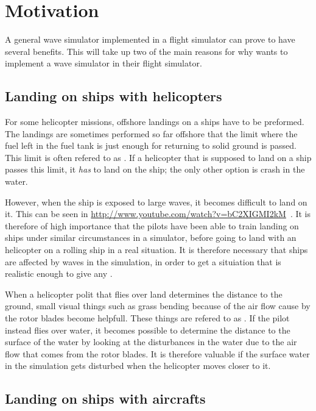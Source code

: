 \chapter{Motivation}

A general wave simulator implemented in a flight simulator can prove to have several benefits. This \levelname will take up two of the main reasons for why \Saab wants to implement a wave simulator in their flight simulator.

\section{Landing on ships with helicopters}

For some helicopter missions, offshore landings on a ships have to be preformed. The landings are sometimes performed so far offshore that the limit where the fuel left in the fuel tank is just enough for returning to solid ground is passed. This limit is often refered to as . If a helicopter that is supposed to land on a ship passes this limit, it \emph{has} to land on the ship; the only other option is crash in the water.

However, when the ship is exposed to large waves, it becomes difficult to land on it. This can be seen in \url{http://www.youtube.com/watch?v=bC2XIGMI2kM}~. It is therefore of high importance that the pilots have been able to train landing on ships under similar circumstances in a simulator, before going to land with an helicopter on a rolling ship in a real situation. It is therefore necessary that ships are affected by waves in the simulation, in order to get a situiation that is realistic enough to give any .

When a helicopter polit that flies over land determines the distance to the ground, small visual things such as grass bending because of the air flow cause by the rotor blades become helpfull. These things are refered to as . If the pilot instead flies over water, it becomes possible to determine the distance to the surface of the water by looking at the disturbances in the water due to the air flow that comes from the rotor blades. It is therefore valuable if the surface water in the simulation gets disturbed when the helicopter moves closer to it.

\section{Landing on ships with aircrafts}

